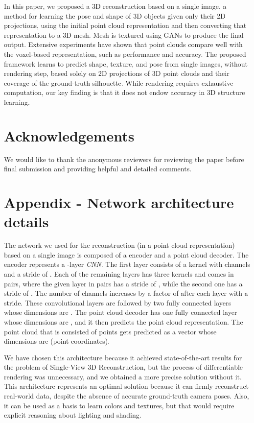\documentclass[runningheads]{llncs}
\begin{document}
In this paper, we proposed a 3D reconstruction based on a single image, a method for learning the pose and shape of 3D objects given only their 2D projections, using the initial point cloud representation and then converting that representation to a 3D mesh. Mesh is textured using GANs to produce the final output. Extensive experiments have shown that point clouds compare well with the voxel-based representation, such as performance and accuracy. The proposed framework learns to predict shape, texture, and pose from single images, without rendering step, based solely on 2D projections of 3D point clouds and their coverage of the ground-truth silhouette. While rendering requires exhaustive computation, our key finding is that it does not endow accuracy in 3D structure learning.

\section{Acknowledgements}
We would like to thank the anonymous reviewers for reviewing the paper before final submission and providing helpful and detailed comments.

\FloatBarrier




\clearpage
\newpage
\onecolumn

\appendix

\section{Appendix - Network architecture details}
\label{sec:network_arch}
The network we used for the  reconstruction (in a point cloud representation) based on a single image is composed of a  encoder and a  point cloud decoder. The  encoder represents a -layer \textit{CNN}. The first layer consists of a  kernel with  channels and a stride of . Each of the remaining layers has three kernels and comes in pairs, where the given layer in pairs has a stride of , while the second one has a stride of . The number of channels increases by a factor of  after each layer with a stride. These convolutional layers are followed by two fully connected layers whose dimensions are . The  point cloud decoder has one fully connected layer whose dimensions are , and it then predicts the point cloud representation. The point cloud that is consisted of  points gets predicted as a vector whose dimensions are  (point coordinates).

We have chosen this architecture because it achieved state-of-the-art results for the problem of Single-View 3D Reconstruction, but the process of differentiable rendering was unnecessary, and we obtained a more precise solution without it. This architecture represents an optimal solution because it can firmly reconstruct real-world data, despite the absence of accurate ground-truth camera poses. Also, it can be used as a basis to learn colors and textures, but that would require explicit reasoning about lighting and shading.
\end{document}
